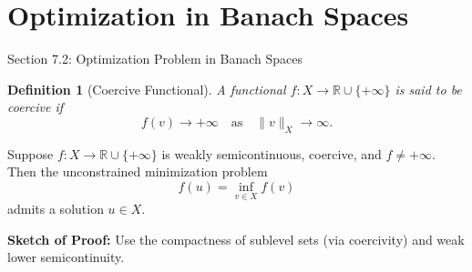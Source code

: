 \documentclass[aspectratio=169,10pt]{beamer}
\newtheorem{definition}{Definition}
\begin{document}
\section{Optimization in Banach Spaces}

\begin{frame}{Section 7.2: Optimization Problem in Banach Spaces}
  \begin{definition}[Coercive Functional]
    A functional $f: X \to \mathbb{R} \cup \{+\infty\}$ is said to be \textit{coercive} if
    \[
    f(v) \to +\infty \quad \text{as} \quad \|v\|_X \to \infty.
    \]
  \end{definition}

  \vspace{0.5cm}

  \begin{theorem}
    Suppose $f: X \to \mathbb{R} \cup \{+\infty\}$ is weakly semicontinuous, coercive, and $f \neq +\infty$. Then the unconstrained minimization problem
    \[
    f(u) = \inf_{v \in X} f(v)
    \]
    admits a solution $u \in X$.
  \end{theorem}

  \vspace{0.3cm}
  \textbf{Sketch of Proof:} Use the compactness of sublevel sets (via coercivity) and weak lower semicontinuity.
\end{frame}
\end{document}
